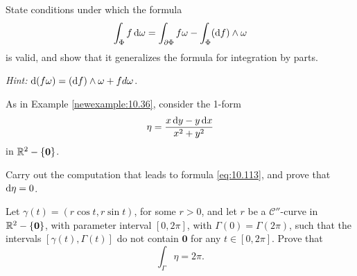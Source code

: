\begin{myexercise}
    \label{ex:10.20}
    State conditions under which the formula
    \begin{equation*}
        \int_{\Phi} f \d \omega =
        \int_{\partial\Phi} f \omega -
        \int_{\Phi} (\d f) \wedge \omega
    \end{equation*}
    is valid, and show that it generalizes the formula for integration by parts.

    \emph{Hint:} $\d(f \omega) = (\d f) \wedge \omega + f d\omega$.
\end{myexercise}


\begin{myexercise}
    \label{ex:10.21}
    As in Example \ref{newexample:10.36}, consider the 1-form
    \begin{equation*}
        \eta = \frac{x \d y - y \d x}{x^2+y^2}
    \end{equation*}
    in ${\protect\mathbb R}^2 - \{\mathbf{0}\}$.
    \begin{asparaenum}[(a)]
        \item Carry out the computation that leads to formula \eqref{eq:10.113}, and prove that $\d \eta = 0$.
        \item Let $\gamma(t) = (r \cos t, r \sin t)$, for some $r > 0$,
        and let $r$ be a $\mathscr{C}''$-curve in ${\protect\mathbb R}^2 - \{\mathbf{0}\}$,
        with parameter interval $[0, 2\pi]$, with $\Gamma(0) = \Gamma(2\pi)$, such that the intervals $[\gamma(t), \Gamma(t)]$ do not contain $\mathbf{0}$ for any $t \in $$[0, 2\pi]$. Prove that
            \begin{equation*}
                \int_{\Gamma} \eta = 2 \pi .
            \end{equation*}


\end{asparaenum}
\end{myexercise}
